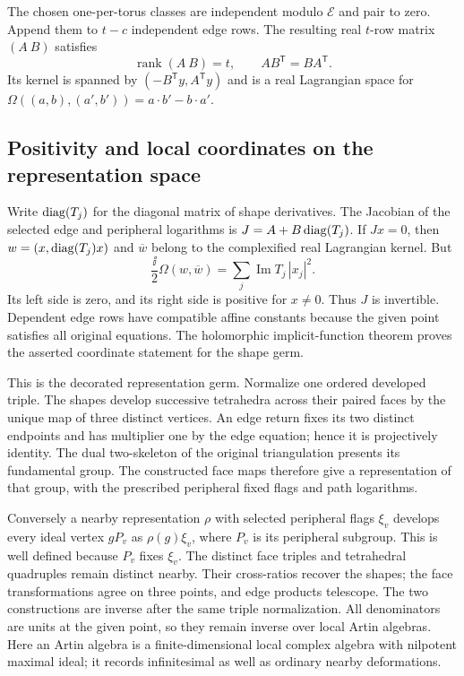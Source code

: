 The chosen one-per-torus classes are independent modulo
$\mathcal E$ and pair to zero. Append them to $t-c$ independent
edge rows. The resulting real $t$-row matrix $(A\ B)$ satisfies
\begin{equation}\label{ng:real-rows}
 \operatorname{rank}(A\ B)=t,\qquad
 AB^{\mathsf T}=BA^{\mathsf T}.
\end{equation}
Its kernel is spanned by $(-B^{\mathsf T}y,A^{\mathsf T}y)$ and
is a real Lagrangian space for
$\Omega((a,b),(a',b'))=a\cdot b'-b\cdot a'$.

\subsection{Positivity and local coordinates on the representation space}
Write $\operatorname{diag}(T_j)$ for the diagonal matrix of shape derivatives.
The Jacobian of the selected edge and peripheral logarithms is
$J=A+B\operatorname{diag}(T_j)$.
If $Jx=0$, then
$w=(x,\operatorname{diag}(T_j)x)$ and $\overline w$ belong to the
complexified real Lagrangian kernel. But
\begin{equation}\label{ng:polarization}
 \frac{\ii}{2}\Omega(w,\overline w)
              =\sum_j\operatorname{Im}T_j\,|x_j|^2 .
\end{equation}
Its left side is zero, and its right side is positive for $x\ne0$.
Thus $J$ is invertible. Dependent edge rows have compatible affine
constants because the given point satisfies all original equations.
The holomorphic implicit-function theorem proves the asserted
coordinate statement for the shape germ.

This is the decorated representation germ. Normalize one
ordered developed triple. The shapes develop successive tetrahedra
across their paired faces by the unique map of three distinct
vertices. An edge return fixes its two distinct endpoints and
has multiplier one by the edge equation; hence it is
projectively identity. The dual two-skeleton of the original
triangulation presents its fundamental group. The constructed
face maps therefore give a representation of that group, with
the prescribed peripheral fixed flags and path logarithms.

Conversely a nearby representation $\rho$ with selected peripheral
flags $\xi_v$ develops every ideal vertex $gP_v$ as
$\rho(g)\xi_v$, where $P_v$ is its peripheral subgroup.
This is well defined because $P_v$ fixes $\xi_v$.
The distinct face triples and tetrahedral quadruples remain
distinct nearby. Their cross-ratios recover the shapes; the
face transformations agree on three points, and edge products
telescope. The two constructions are inverse after the same
triple normalization. All denominators are units at the given
point, so they remain inverse over local Artin algebras.
Here an Artin algebra is a finite-dimensional local complex
algebra with nilpotent maximal ideal; it records infinitesimal
as well as ordinary nearby deformations.

